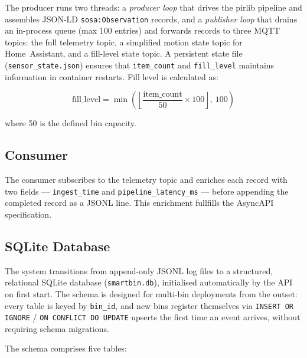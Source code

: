 \documentclass[10pt,a4paper]{article}
\begin{document}
The producer runs two threads: a \textit{producer loop} that drives the pirlib pipeline
and assembles JSON-LD \texttt{sosa:Observation} records, and a \textit{publisher loop}
that drains an in-process queue (max 100 entries) and forwards records to three MQTT
topics: the full telemetry topic, a simplified motion state topic for Home~Assistant,
and a fill-level state topic. A persistent state file (\texttt{sensor\_state.json})
ensures that \texttt{item\_count} and \texttt{fill\_level} maintains information in container restarts.
Fill level is calculated as:

\[
\text{fill\_level} = \min\!\left(\left\lfloor\frac{\text{item\_count}}{50} \times 100\right\rfloor,\ 100\right)
\]

where 50 is the defined bin capacity.

\subsection{Consumer}

The consumer subscribes to the telemetry topic and enriches each record with two
fields --- \texttt{ingest\_time} and \texttt{pipeline\_latency\_ms} --- before appending
the completed record as a JSONL line. This enrichment fullfills the AsyncAPI specification.

\subsection{SQLite Database}

The system transitions from append-only JSONL log files to a structured, relational SQLite database (\texttt{smartbin.db}), initialised automatically by the API on first start. The schema is designed for multi-bin deployments from the outset: every table is keyed by \texttt{bin\_id}, and new bins register themselves via \texttt{INSERT OR IGNORE} / \texttt{ON CONFLICT DO UPDATE} upserts the first time an event arrives, without requiring schema migrations.

The schema comprises five tables:
\end{document}
